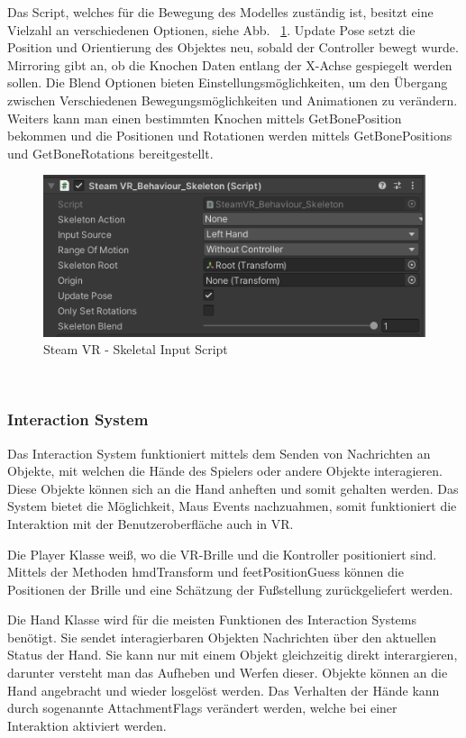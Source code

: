 Das Script, welches für die Bewegung des Modelles zuständig ist, besitzt eine Vielzahl an verschiedenen Optionen, siehe Abb. ~\ref{fig:steamvr_skeletal_input_Script}.
Update Pose setzt die Position und Orientierung des Objektes neu, sobald der Controller bewegt wurde.
Mirroring gibt an, ob die Knochen Daten entlang der X-Achse gespiegelt werden sollen.
Die Blend Optionen bieten Einstellungsmöglichkeiten, um den Übergang zwischen Verschiedenen Bewegungsmöglichkeiten und Animationen zu verändern.
Weiters kann man einen bestimmten Knochen mittels GetBonePosition bekommen und die Positionen und Rotationen werden mittels GetBonePositions und GetBoneRotations bereitgestellt.
\begin {figure}
    \centering
    \includegraphics[scale=1]{pics/steamVR_skeletal_input_script}
    \caption{Steam VR - Skeletal Input Script}
    \label{fig:steamvr_skeletal_input_Script}
\end {figure}
~\cite{SteamVR_Skeleton_Input_2022}

\subsubsection{Interaction System}
Das Interaction System funktioniert mittels dem Senden von Nachrichten an Objekte, mit welchen die Hände des Spielers oder andere Objekte interagieren.
Diese Objekte können sich an die Hand anheften und somit gehalten werden.
Das System bietet die Möglichkeit, Maus Events nachzuahmen, somit funktioniert die Interaktion mit der Benutzeroberfläche auch in VR.

Die Player Klasse weiß, wo die VR-Brille und die Kontroller positioniert sind.
Mittels der Methoden hmdTransform und feetPositionGuess können die Positionen der Brille und eine Schätzung der Fußstellung zurückgeliefert werden.

Die Hand Klasse wird für die meisten Funktionen des Interaction Systems benötigt.
Sie sendet interagierbaren Objekten Nachrichten über den aktuellen Status der Hand.
Sie kann nur mit einem Objekt gleichzeitig direkt interargieren, darunter versteht man das Aufheben und Werfen dieser.
Objekte können an die Hand angebracht und wieder losgelöst werden.
Das Verhalten der Hände kann durch sogenannte AttachmentFlags verändert werden, welche bei einer Interaktion aktiviert werden.


